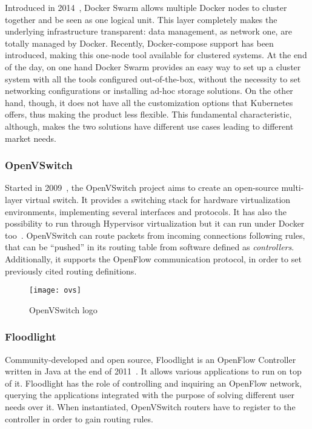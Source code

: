 Introduced in 2014~\cite{swarmGit}, Docker Swarm allows multiple Docker nodes to
cluster together and be seen as one logical unit. This layer completely makes
the underlying infrastructure transparent: data management, as network one, are
totally managed by Docker. Recently, Docker-compose support has been introduced,
making this one-node tool available for clustered systems. At the end of the
day, on one hand Docker Swarm provides an easy way to set up a cluster system
with all the tools configured out-of-the-box, without the necessity to set
networking configurations or installing ad-hoc storage solutions. On the other
hand, though, it does not have all the customization options that Kubernetes
offers, thus making the product less flexible. This fundamental characteristic,
although, makes the two solutions have different use cases leading to different
market needs.

\subsubsection{OpenVSwitch}
Started in 2009~\cite{ovsGit}, the OpenVSwitch project aims to create an
open-source multi-layer virtual switch. It provides a switching stack for
hardware virtualization environments, implementing several interfaces and
protocols. It has also the possibility to run through Hypervisor virtualization
but it can run under Docker too~\cite{ovsDocker}. OpenVSwitch can route packets
from incoming connections following rules, that can be ``pushed'' in its routing
table from software defined as \textit{controllers}. Additionally, it supports
the OpenFlow communication protocol, in order to set previously cited routing
definitions.

\begin{figure}[h]
  \centering
  \texttt{[image: ovs]}
  \caption[OpenVSwitch logo]{OpenVSwitch logo}
\end{figure}

\subsubsection{Floodlight}
\label{chap:prjan:sec:tech:sub:other:sub:floodlight}
Community-developed and open source, Floodlight is an OpenFlow Controller
written in Java at the end of 2011~\cite{floodlightGit}. It allows various
applications to run on top of it. Floodlight has the role of controlling and
inquiring an OpenFlow network, querying the applications integrated with the
purpose of solving different user needs over it. When instantiated, OpenVSwitch
routers have to register to the controller in order to gain routing rules.

